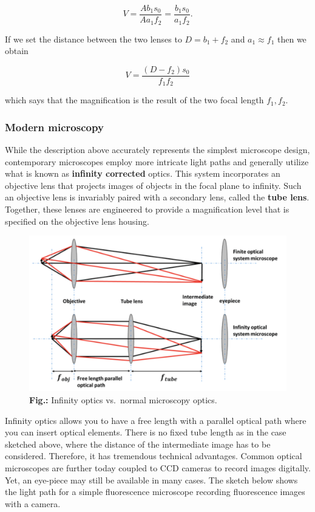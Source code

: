 \documentclass[
  a4paper,
]{book}
\begin{document}
\[
V=\frac{A b_1 s_0}{A a_1 f_2}=\frac{b_1 s_0}{a_1 f_2}.
\]

If we set the distance between the two lenses to \(D=b_1+f_2\) and
\(a_1\approx f_1\) then we obtain

\[
V=\frac{(D-f_2)s_0}{f_1 f_2}
\]

which says that the magnification is the result of the two focal length
\(f_1,f_2\).

\subsubsection{Modern microscopy}\label{modern-microscopy}

While the description above accurately represents the simplest
microscope design, contemporary microscopes employ more intricate light
paths and generally utilize what is known as \textbf{infinity corrected}
optics. This system incorporates an objective lens that projects images
of objects in the focal plane to infinity. Such an objective lens is
invariably paired with a secondary lens, called the \textbf{tube lens}.
Together, these lenses are engineered to provide a magnification level
that is specified on the objective lens housing.

\begin{figure}[H]

{\centering \includegraphics[width=0.6\linewidth,height=\textheight,keepaspectratio]{geometrical-optics/img/infinity_optics.png}

}

\caption{\textbf{Fig.:} Infinity optics vs.~normal microscopy optics.}

\end{figure}%

Infinity optics allows you to have a free length with a parallel optical
path where you can insert optical elements. There is no fixed tube
length as in the case sketched above, where the distance of the
intermediate image has to be considered. Therefore, it has tremendous
technical advantages. Common optical microscopes are further today
coupled to CCD cameras to record images digitally. Yet, an eye-piece may
still be available in many cases. The sketch below shows the light path
for a simple fluorescence microscope recording fluorescence images with
a camera.
\end{document}
